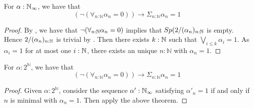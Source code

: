 \begin{theorem}
  For $\alpha:\mathbb{N}_{\infty}$, we have that 
  \[
    (\neg (\forall_{n:\mathbb N} \alpha_n= 0)) \to \Sigma_{n:\mathbb N} \alpha_n= 1
  \]
\end{theorem}
\begin{proof}
  By , we have that $\neg(\forall_{n:\mathbb{N}} \alpha_n = 0)$ implies that 
  $Sp(2/(\alpha_n)_{n:\mathbb{N}}$ is empty. 
  Hence $2/(\alpha_n)_{n:\mathbb{N}}$ is trivial by . 
  Then there exists $k:\mathbb{N}$ such that $\bigvee_{i\leq k} \alpha_i = 1$. 
  As $\alpha_i = 1$ for at most one $i:\mathbb{N}$, 
  there exists an unique $n:\mathbb N$ with $\alpha_n = 1$. 
\end{proof}

\begin{corollary}\label{MarkovPrinciple}
  For $\alpha:2^\mathbb N$, we have that 
  \[
    (\neg (\forall_{n:\mathbb N} \alpha_n= 0)) \to \Sigma_{n:\mathbb N} \alpha_n= 1
  \]
\end{corollary}
\begin{proof}
  Given $\alpha:2^\mathbb N$, consider the sequence $\alpha':\mathbb{N}_{\infty}$ satisfying $\alpha'_n = 1$ if and only if
  $n$ is minimal with $\alpha_n = 1$. Then apply the above theorem.
\end{proof}

